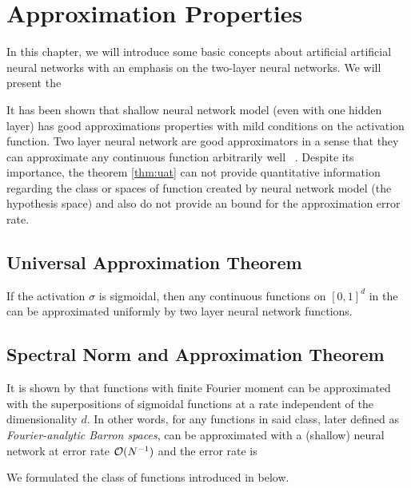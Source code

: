 \chapter{Approximation Properties}

In this chapter, we will introduce some basic concepts about  
artificial artificial neural networks with an emphasis on the 
two-layer neural networks. We will present the 

It has been shown that shallow neural network model (even with one hidden layer) has good approximations properties with mild conditions on the activation function. Two layer neural network are good approximators in a sense that they can approximate
any continuous function arbitrarily well ~\cite{cybenkoApproximationSuperpositionsSigmoidal1989}. 
Despite its importance, the theorem \ref{thm:uat} can not provide quantitative 
information regarding the class or spaces of function created by neural network
model (the hypothesis space) and also do not provide an bound for the approximation 
error rate. 

\section{Universal Approximation Theorem}

\begin{theorem}\label{thm:uat}
    \cite[Theorem 5]{cybenkoApproximationSuperpositionsSigmoidal1989} If the activation $\sigma$ is sigmoidal,
    then any continuous functions on $[0, 1]^d$ in the can be approximated 
    uniformly by two layer neural network functions. 
\end{theorem}


\section{Spectral Norm and Approximation Theorem}

It is shown by \cite{barronUniversalApproximationBounds1993} that functions with finite Fourier moment 
can be approximated with the superpositions of sigmoidal functions at a rate 
independent of the dimensionality $d$. In other words, for any functions in said
class,  later defined as \textit{Fourier-analytic Barron spaces}, can be approximated
with a (shallow) neural network at error rate $\mathcal{O}(N^{-1})$ and the error rate is

We formulated the class of functions introduced in \cite{barronNeuralNetApproximation1992, barronUniversalApproximationBounds1993} below. 

